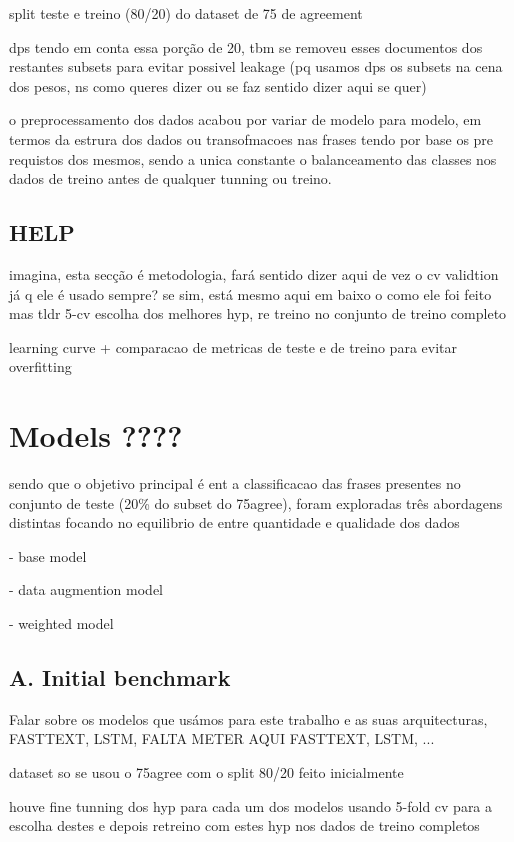 \documentclass[conference]{IEEEtran}
\begin{document}
split teste e treino (80/20) do dataset de 75 de agreement

dps tendo em conta essa porção de 20, tbm se removeu esses documentos dos restantes subsets para evitar possivel leakage (pq usamos dps os subsets na cena dos pesos, ns como queres dizer ou se faz sentido dizer aqui se quer)

o preprocessamento dos dados acabou por variar de modelo para modelo, em termos da estrura dos dados ou transofmacoes nas frases tendo por base os pre requistos dos mesmos, sendo a unica constante o balanceamento das classes nos dados de treino antes de qualquer tunning ou treino.

\subsection{HELP}

imagina, esta secção é metodologia, fará sentido dizer aqui de vez o cv validtion já q ele é usado sempre? se sim, está mesmo aqui em baixo o como ele foi feito mas tldr 5-cv escolha dos melhores hyp, re treino no conjunto de treino completo

learning curve + comparacao de metricas de teste e de treino para evitar overfitting

\section{Models ????}

sendo que o objetivo principal é ent a classificacao das frases presentes no conjunto de teste (20\% do subset do 75agree), foram exploradas três abordagens distintas focando no equilibrio de entre quantidade e qualidade dos dados

- base model

- data augmention model

- weighted model

\subsection{A. Initial benchmark}

Falar sobre os modelos que usámos para este trabalho e as suas arquitecturas, FASTTEXT, LSTM, 
FALTA METER AQUI FASTTEXT, LSTM, ...

dataset so se usou o 75agree com o split 80/20 feito inicialmente

houve fine tunning dos hyp para cada um dos modelos usando 5-fold cv para a escolha destes e depois retreino com estes hyp nos dados de treino completos
\end{document}
